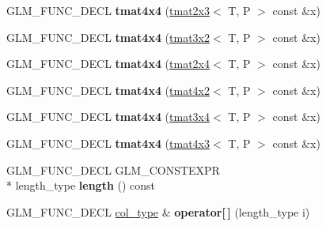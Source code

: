 \begin{DoxyCompactItemize}
\item 
\hypertarget{structglm_1_1tmat4x4_a7ca6ef18265f0c452fb9793559c92a27}{G\-L\-M\-\_\-\-F\-U\-N\-C\-\_\-\-D\-E\-C\-L {\bfseries tmat4x4} (\hyperlink{structglm_1_1tmat2x3}{tmat2x3}$<$ T, P $>$ const \&x)}\label{structglm_1_1tmat4x4_a7ca6ef18265f0c452fb9793559c92a27}

\item 
\hypertarget{structglm_1_1tmat4x4_ab617c44967e3fa51703cb9213d1a8d9e}{G\-L\-M\-\_\-\-F\-U\-N\-C\-\_\-\-D\-E\-C\-L {\bfseries tmat4x4} (\hyperlink{structglm_1_1tmat3x2}{tmat3x2}$<$ T, P $>$ const \&x)}\label{structglm_1_1tmat4x4_ab617c44967e3fa51703cb9213d1a8d9e}

\item 
\hypertarget{structglm_1_1tmat4x4_a693a44a394fcf7453a67b8e646e930ad}{G\-L\-M\-\_\-\-F\-U\-N\-C\-\_\-\-D\-E\-C\-L {\bfseries tmat4x4} (\hyperlink{structglm_1_1tmat2x4}{tmat2x4}$<$ T, P $>$ const \&x)}\label{structglm_1_1tmat4x4_a693a44a394fcf7453a67b8e646e930ad}

\item 
\hypertarget{structglm_1_1tmat4x4_a8fcbf178e4d9fc9c0c4d33b4dbfdcdf6}{G\-L\-M\-\_\-\-F\-U\-N\-C\-\_\-\-D\-E\-C\-L {\bfseries tmat4x4} (\hyperlink{structglm_1_1tmat4x2}{tmat4x2}$<$ T, P $>$ const \&x)}\label{structglm_1_1tmat4x4_a8fcbf178e4d9fc9c0c4d33b4dbfdcdf6}

\item 
\hypertarget{structglm_1_1tmat4x4_a620455812898da7dc721fb93f09e44fe}{G\-L\-M\-\_\-\-F\-U\-N\-C\-\_\-\-D\-E\-C\-L {\bfseries tmat4x4} (\hyperlink{structglm_1_1tmat3x4}{tmat3x4}$<$ T, P $>$ const \&x)}\label{structglm_1_1tmat4x4_a620455812898da7dc721fb93f09e44fe}

\item 
\hypertarget{structglm_1_1tmat4x4_a86de8788e03d2931fa79e3431922fb93}{G\-L\-M\-\_\-\-F\-U\-N\-C\-\_\-\-D\-E\-C\-L {\bfseries tmat4x4} (\hyperlink{structglm_1_1tmat4x3}{tmat4x3}$<$ T, P $>$ const \&x)}\label{structglm_1_1tmat4x4_a86de8788e03d2931fa79e3431922fb93}

\item 
\hypertarget{structglm_1_1tmat4x4_a2222bd4a0ea8f8c33a6e25e070b6c9e6}{G\-L\-M\-\_\-\-F\-U\-N\-C\-\_\-\-D\-E\-C\-L G\-L\-M\-\_\-\-C\-O\-N\-S\-T\-E\-X\-P\-R \\*
length\-\_\-type {\bfseries length} () const }\label{structglm_1_1tmat4x4_a2222bd4a0ea8f8c33a6e25e070b6c9e6}

\item 
\hypertarget{structglm_1_1tmat4x4_a4be08a6a3f8cb1f0954c2d0347961582}{G\-L\-M\-\_\-\-F\-U\-N\-C\-\_\-\-D\-E\-C\-L \hyperlink{structglm_1_1tvec4}{col\-\_\-type} \& {\bfseries operator\mbox{[}$\,$\mbox{]}} (length\-\_\-type i)}\label{structglm_1_1tmat4x4_a4be08a6a3f8cb1f0954c2d0347961582}


\end{DoxyCompactItemize}
